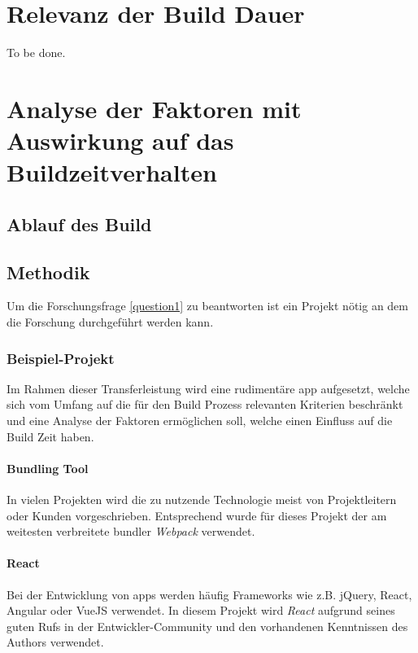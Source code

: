 \documentclass[11pt]{article}
\begin{document}
	\section{Relevanz der Build Dauer}
		To be done. %
		
	\section{Analyse der Faktoren mit Auswirkung auf das Buildzeitverhalten}
		\subsection{Ablauf des Build}
		\subsection{Methodik}
			Um die Forschungsfrage \ref{question1} zu beantworten ist ein Projekt nötig an dem die Forschung durchgeführt werden kann.
			\subsubsection{Beispiel-Projekt}
				Im Rahmen dieser Transferleistung wird eine rudimentäre \Gls{app} aufgesetzt, welche sich vom Umfang auf die für den Build Prozess relevanten Kriterien beschränkt und eine Analyse der Faktoren ermöglichen soll, welche einen Einfluss auf die Build Zeit haben.
				
				\paragraph{Bundling Tool} In vielen Projekten wird die zu nutzende Technologie meist von Projektleitern oder Kunden vorgeschrieben. Entsprechend wurde für dieses Projekt der am weitesten verbreitete \Gls{bundler} \emph{Webpack} verwendet. %
				
				\paragraph{React} Bei der Entwicklung von \Glspl{app} werden häufig Frameworks wie z.B. jQuery, React, Angular oder VueJS verwendet. In diesem Projekt wird \emph{React} aufgrund seines guten Rufs in der Entwickler-Community und den vorhandenen Kenntnissen des Authors verwendet. %
				
\end{document}
